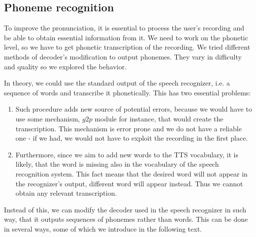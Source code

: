 \subsection{Phoneme recognition}
\label{ph-rec}
To improve the pronunciation, it is essential to process the user's recording and be able to obtain essential information from it.
We need to work on the phonetic level, so we have to get phonetic transcription of the recording.
We tried different methods of decoder's modification to output phonemes.
They vary in difficulty and quality so we explored the behavior.
\par
In theory, we could use the standard output of the speech recognizer, i.e. a sequence of words and transcribe it phonetically.
This has two essential problems:
\begin{enumerate}
\item Such procedure adds new source of potential errors, because we would have to use some mechanism, $g2p$ module for instance, that would create the transcription. This mechanism is error prone and we do not have a reliable one - if we had, we would not have to exploit the recording in the first place.
\item Furthermore, since we aim to add new words to the TTS vocabulary, it is likely, that the word is missing also in the vocabulary of the speech recognition system.
This fact means that the desired word will not appear in the recognizer's output, different word will appear instead.
Thus we cannot obtain any relevant transcription.
\end{enumerate}
Instead of this, we can modify the decoder used in the speech recognizer in such way, that it outputs sequences of phonemes rather than words.
This can be done in several ways, some of which we introduce in the following text.
